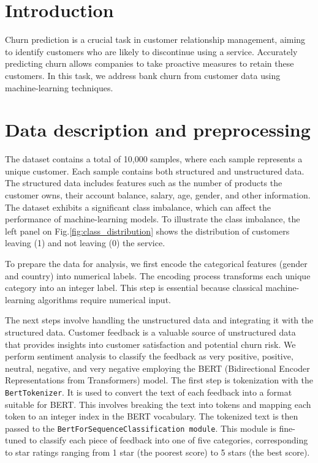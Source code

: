\documentclass[12pt]{article}
\begin{document}
\section{Introduction}
Churn prediction is a crucial task in customer relationship management, aiming to identify customers who are likely to discontinue using a service. Accurately predicting churn allows companies to take proactive measures to retain these customers. In this task, we address bank churn from customer data using machine-learning techniques. 

\section{Data description and preprocessing}
The dataset contains a total of 10,000 samples, where each sample represents a unique customer. Each sample contains both structured and unstructured data. The structured data includes features such as the number of products the customer owns, their account balance, salary, age, gender, and other information. The dataset exhibits a significant class imbalance, which can affect the performance of machine-learning models. To illustrate the class imbalance, the left panel on Fig.\ref{fig:class_distribution} shows the distribution of customers leaving (1) and not leaving (0) the service. 

To prepare the data for analysis, we first encode the categorical features (gender and country) into numerical labels. The encoding process transforms each unique category into an integer label. This step is essential because classical machine-learning algorithms require numerical input. 

The next steps involve handling the unstructured data and integrating it with the structured data. Customer feedback is a valuable source of unstructured data that provides insights into customer satisfaction and potential churn risk.  We perform sentiment analysis to classify the feedback as very positive, positive, neutral, negative, and very negative employing the \textsc{BERT} (Bidirectional Encoder Representations from Transformers) model. The first step is tokenization with the \texttt{BertTokenizer}. It is used to convert the text of each feedback into a format suitable for \textsc{BERT}. This involves breaking the text into tokens and mapping each token to an integer index in the \textsc{BERT} vocabulary. The tokenized text is then passed to the \texttt{BertForSequenceClassification module}. This module is fine-tuned to classify each piece of feedback into one of five categories, corresponding to star ratings ranging from 1 star (the poorest score) to 5 stars (the best score).
\end{document}
